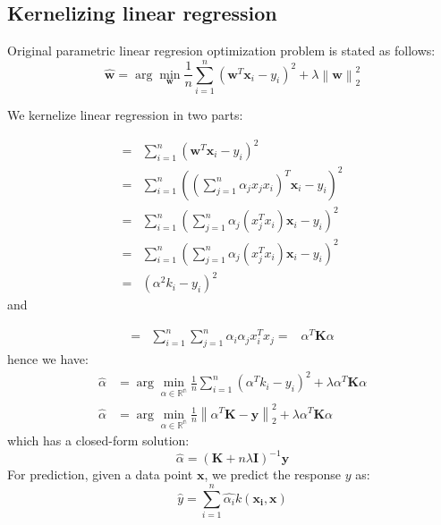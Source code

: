 \documentclass[a4paper,10pt,twoside]{article}
\newcommand\norm[1]{\left\lVert#1\right\rVert}
\begin{document}
\subsection{Kernelizing linear regression}

Original parametric linear regresion optimization problem is stated as follows:
\begin{equation*}
    \hat{\mathbf{w}}=\arg\min_{\mathbf{w}}\frac{1}{n}\sum_{i=1}^{n}(\mathbf{w}^T\mathbf{x}_i-y_i)^2+\lambda\norm{\mathbf{w}}_2^2
\end{equation*}

We kernelize linear regression in two parts:

\begin{align*}
    =& \sum_{i=1}^{n}(\mathbf{w}^T\mathbf{x}_i-y_i)^2\\
    =& \sum_{i=1}^{n}((\sum_{j=1}^{n}\alpha_jx_jx_i)^T\mathbf{x}_i-y_i)^2\\
    =& \sum_{i=1}^{n}(\sum_{j=1}^{n}\alpha_j(x_j^Tx_i)\mathbf{x}_i-y_i)^2\\
    =& \sum_{i=1}^{n}(\sum_{j=1}^{n}\alpha_j(x_j^Tx_i)\mathbf{x}_i-y_i)^2\\
    =& (\alpha^2k_i-y_i)^2
\end{align*}
and 

\begin{align*}
    =& \sum_{i=1}^{n}\sum_{j=1}^{n}\alpha_i\alpha_jx_i^Tx_j
    =& \alpha^T\mathbf{K}\alpha
\end{align*}
hence we have:
\begin{align*}
    \hat{\alpha}&=\arg\min_{\alpha\in\mathbb{R^n}}\frac{1}{n}\sum_{i=1}^{n}(\alpha^Tk_i-y_i)^2+\lambda\alpha^T\mathbf{K}\alpha\\
    \hat{\alpha}&=\arg\min_{\alpha\in\mathbb{R^n}}\frac{1}{n}\norm{\alpha^T\mathbf{K}-\mathbf{y}}_2^2+\lambda\alpha^T\mathbf{K}\alpha
\end{align*}
which has a closed-form solution:
\begin{equation*}
    \hat{\alpha}=(\mathbf{K}+n\lambda \mathbf{I})^{-1}\mathbf{y}
\end{equation*} 
For prediction, given a data point $\mathbf{x}$, we predict the response $y$ as:
\begin{equation*}
    \hat{y}=\sum_{i=1}^{n}\hat{\alpha_i}k(\mathbf{x_i},\mathbf{x})
\end{equation*}
\end{document}
